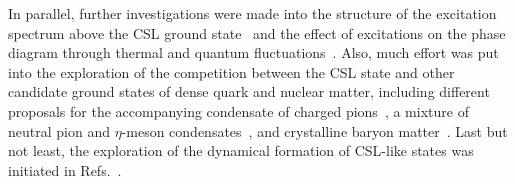 \documentclass[pdflatex,iicol,sn-mathphys-num]{sn-jnl}
\begin{document}
In parallel, further investigations were made into the structure of the excitation spectrum above the CSL ground state~\cite{Yamamoto:2015maz,Ozaki:2016vwu,Brauner:2017mui} and the effect of excitations on the phase diagram through thermal and quantum fluctuations~\cite{Brauner:2021sci,Brauner:2023ort}. Also, much effort was put into the exploration of the competition between the CSL state and other candidate ground states of dense quark and nuclear matter, including different proposals for the accompanying condensate of charged pions~\cite{Evans:2022hwr,Eto:2025fkt,Eto:2023wul,Evans:2023hms}, a mixture of neutral pion and $\eta$-meson condensates~\cite{Qiu:2023guy}, and crystalline baryon matter~\cite{Chen:2021vou,Qiu:2024zpg,Amari:2025twm}. Last but not least, the exploration of the dynamical formation of CSL-like states was initiated in Refs.~\cite{Eto:2022lhu,Higaki:2022gnw,Nishimura:2023czx,Eto:2025ebz}.
\end{document}
